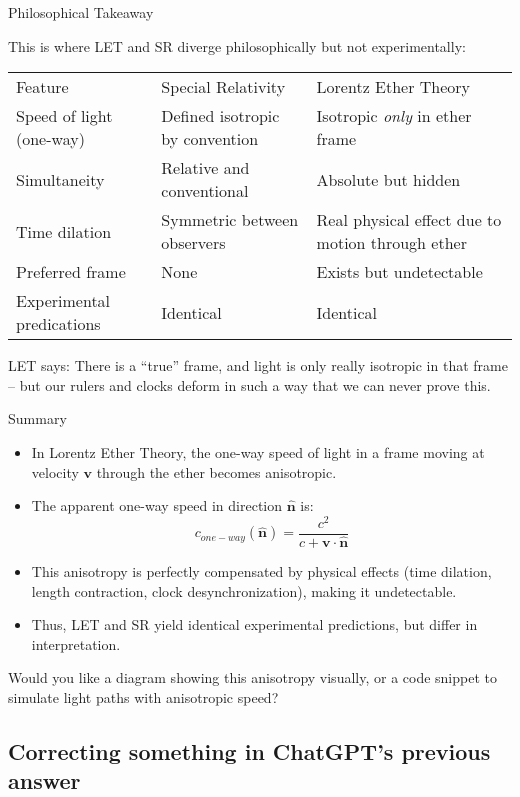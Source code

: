 \documentclass[a4paper]{article}
\theoremstyle{plain}
\theoremstyle{definition}
\newcommand{\vect}[1]{\mathbf{#1}}
\newcommand{\hatvec}[1]{\hat{\mathbf{#1}}}
\begin{document}
Philosophical Takeaway

This is where LET and SR diverge philosophically but not
experimentally:

\begin{tabularx}{1.0\textwidth}{|p{4.5cm}|p{4.5cm}|p{4.5cm}|}
\cline{1-3} \\
Feature & Special Relativity & Lorentz Ether Theory
\\ \cline{1-3}
Speed of light (one-way) & Defined isotropic by convention & Isotropic {\em only} in ether frame
\\ \cline{1-3}
Simultaneity & Relative and conventional & Absolute but hidden
\\ \cline{1-3}
Time dilation & Symmetric between observers & Real physical effect due to motion through ether
\\ \cline{1-3}
Preferred frame & None & Exists but undetectable
\\ \cline{1-3}
Experimental predications & Identical & Identical
\\ \cline{1-3}
\end{tabularx}
LET says: There is a ``true'' frame, and light is only really
isotropic in that frame -- but our rulers and clocks deform in such a
way that we can never prove this.

Summary

\begin{itemize}
\item In Lorentz Ether Theory, the one-way speed of light in a frame
  moving at velocity $\vect{v}$ through the ether becomes anisotropic.
\item The apparent one-way speed in direction $\hatvec{n}$ is:
\begin{equation}
c_{one-way}(\hatvec{n}) = \frac{c^2}{c + \vect{v}\cdot\hatvec{n}}
\end{equation}
\item This anisotropy is perfectly compensated by physical effects
  (time dilation, length contraction, clock desynchronization), making
  it undetectable.
\item Thus, LET and SR yield identical experimental predictions, but
  differ in interpretation.
\end{itemize}

Would you like a diagram showing this anisotropy visually, or a code
snippet to simulate light paths with anisotropic speed?


\subsection{Correcting something in ChatGPT's previous answer}
\end{document}
